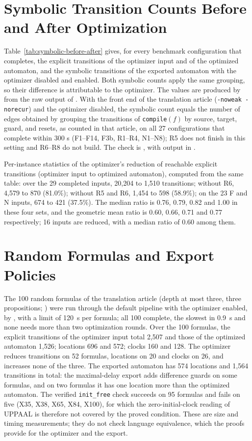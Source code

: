 \documentclass{ieeeaccess}
\begin{document}
\section{Symbolic Transition Counts Before and After Optimization}
Table~\ref{tab:symbolic-before-after} gives, for every benchmark configuration that completes, the explicit
transitions of the optimizer input and of the optimized automaton, and the symbolic transitions of the
exported automaton with the optimizer disabled and enabled. Both symbolic counts apply the same grouping, so
their difference is attributable to the optimizer. The values are produced by
 from the raw output of . With the front end of the translation article (\texttt{-noweak -norecur}) and the optimizer disabled, the symbolic count equals the number of edges obtained by grouping the transitions of \texttt{compile}$(f)$ by source, target, guard, and resets, as counted in that article, on all 27 configurations that complete within 300 s (F1--F14, F3b, R1--R4, N1--N8); R5 does not finish in this setting and R6--R8 do not build. The check is , with output in .


Per-instance statistics of the optimizer's reduction of reachable explicit transitions (optimizer input to optimized automaton), computed from the same table: over the 29 completed inputs, 20,204 to 1,510 transitions; without R6, 4,579 to 870 (81.0\%); without R5 and R6, 1,454 to 598 (58.9\%); on the 23 F and N inputs, 674 to 421 (37.5\%). The median ratio is 0.76, 0.79, 0.82 and 1.00 in these four sets, and the geometric mean ratio is 0.60, 0.66, 0.71 and 0.77 respectively; 16 inputs are reduced, with a median ratio of 0.60 among them.

\section{Random Formulas and Export Policies}
The 100 random formulas of the translation article (depth at most three, three propositions; ) were run through the default pipeline with the optimizer enabled, by , with a limit of 120~s per formula; all 100 complete, the slowest in 0.9~s and none needs more than two optimization rounds. Over the 100 formulas, the explicit transitions of the optimizer input total 2,507 and those of the optimized automaton 1,526; locations 696 and 572; clocks 160 and 128. The optimizer reduces transitions on 52 formulas, locations on 20 and clocks on 26, and increases none of the three. The exported automaton has 574 locations and 1,564 transitions in total: the maximal-delay export adds difference guards on some formulas, and on two formulas it has one location more than the optimized automaton. The verified \texttt{init\_free} check succeeds on 95 formulas and fails on five (X35, X38, X65, X84, X100), for which the zero-initial-clock reading of UPPAAL is therefore not covered by the proved condition. These are size and timing measurements; they do not check language equivalence, which the proofs provide for the optimizer and the export.
\end{document}
